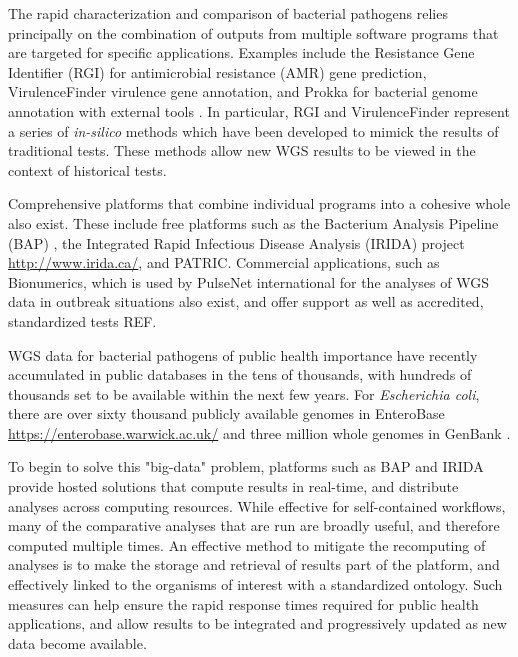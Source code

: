 \documentclass[a4,center,fleqn]{NAR}
\begin{document}
The rapid characterization and comparison of bacterial pathogens relies principally on the combination of outputs from multiple software programs that are targeted for specific applications. Examples include the Resistance Gene Identifier (RGI) \cite{mcarthur2013comprehensive} for antimicrobial resistance (AMR) gene prediction, VirulenceFinder \cite{kleinheinz2014applying} virulence gene annotation, and Prokka for bacterial genome annotation with external tools \cite{doi:10.1093/bioinformatics/btu153}. In particular, RGI and VirulenceFinder represent a series of \textit{in-silico} methods which have been developed to mimick the results of traditional tests. These methods allow new WGS results to be viewed in the context of historical tests.

Comprehensive platforms that combine individual programs into a cohesive whole also exist. These include free platforms such as the Bacterium Analysis Pipeline (BAP) \cite{thomsen2016bacterial}, the Integrated Rapid Infectious Disease Analysis (IRIDA) project \url{http://www.irida.ca/}, and PATRIC. Commercial applications, such as Bionumerics, which is used by PulseNet international for the analyses of WGS data in outbreak situations also exist, and offer support as well as accredited, standardized tests {REF}.

WGS data for bacterial pathogens of public health importance have recently accumulated in public databases in the tens of thousands, with hundreds of thousands set to be available within the next few years. For \textit{Escherichia coli}, there are over sixty thousand publicly available genomes in EnteroBase \url{https://enterobase.warwick.ac.uk/} and three million whole genomes in GenBank \cite{doi:10.1093/nar/gks1195}.

To begin to solve this "big-data" problem, platforms such as BAP and IRIDA provide hosted solutions that compute results in real-time, and distribute analyses across computing resources. While effective for self-contained workflows, many of the comparative analyses that are run are broadly useful, and therefore computed multiple times. An effective method to mitigate the recomputing of analyses is to make the storage and retrieval of results part of the platform, and effectively linked to the organisms of interest with a standardized ontology. Such measures can help ensure the rapid response times required for public health applications, and allow results to be integrated and progressively updated as new data become available.
\end{document}
